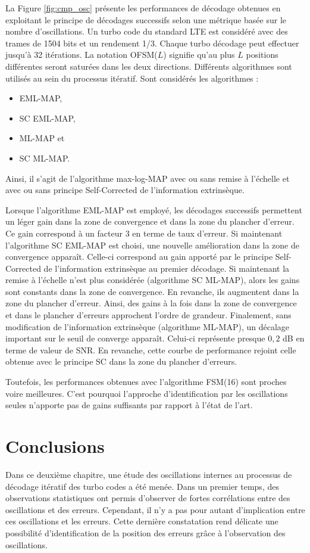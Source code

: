 La Figure \ref{fig:cmp_osc} présente les performances de décodage obtenues en exploitant le principe de décodages successifs selon une 
métrique basée sur le nombre d'oscillations. Un turbo code du standard LTE est considéré avec des trames de 1504 bits et un 
rendement 1/3. Chaque turbo décodage peut effectuer jusqu'à 32 itérations. La notation OFSM($L$) signifie qu'au plus $L$ 
positions différentes seront saturées dans les deux directions. Différents algorithmes sont utilisés au sein du
processus itératif. Sont considérés les algorithmes :
\begin{itemize}
 	\item EML-MAP,
 	\item SC EML-MAP,
 	\item ML-MAP et 
 	\item SC ML-MAP.
 \end{itemize} 
 Ainsi, il s'agit de l'algorithme 
max-log-MAP avec ou sans remise à l'échelle et avec ou sans principe Self-Corrected de l'information extrinsèque.

Lorsque l'algorithme EML-MAP est employé, les décodages successifs permettent un léger gain dans la zone de convergence 
et dans la zone du plancher d'erreur. Ce gain correspond à un facteur 3 en terme de taux d'erreur. Si maintenant l'algorithme SC EML-MAP 
est  choisi, une nouvelle amélioration dans la zone de convergence apparaît. Celle-ci correspond au gain apporté par le 
principe Self-Corrected de l'information extrinsèque au premier décodage. Si maintenant la remise à l'échelle n'est plus 
considérée (algorithme SC ML-MAP), alors les gains sont constants dans la zone de convergence. En revanche, ils augmentent dans 
la zone du plancher d'erreur. Ainsi, des gains à la fois dans la zone de convergence et dans le plancher d'erreurs 
approchent l'ordre de grandeur. Finalement, sans modification de l'information extrinsèque 
(algorithme ML-MAP), un décalage important sur le seuil de converge apparaît. Celui-ci représente presque $0,2$ dB en terme 
de valeur de SNR. En revanche, cette courbe de performance rejoint celle obtenue avec le principe SC dans la zone du 
plancher d'erreurs. 

Toutefois, les performances obtenues avec l'algorithme FSM(16) sont proches voire meilleures. C'est pourquoi l'approche 
d'identification par les oscillations seules n'apporte pas de gains suffisants par rapport à l'état de l'art.

\section{Conclusions}
Dans ce deuxième chapitre, une étude des oscillations internes au processus de décodage itératif des turbo codes a été 
menée. Dans un premier temps, des observations statistiques ont permis d'observer de fortes corrélations entre des oscillations
et des erreurs. Cependant, il n'y a pas pour autant d'implication entre ces oscillations et les erreurs. Cette dernière constatation 
rend délicate une possibilité d'identification de la position des erreurs grâce à l'observation des oscillations.

